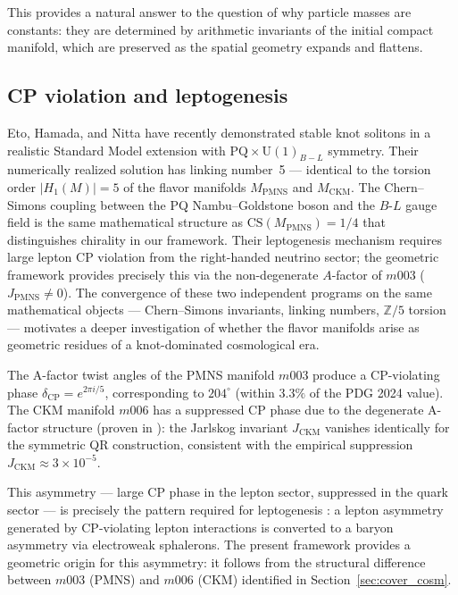 ﻿\documentclass[12pt]{article}
\theoremstyle{definition}
\begin{document}
This provides a natural answer to the question of why particle
masses are constants: they are determined by arithmetic invariants
of the initial compact manifold, which are preserved as the spatial
geometry expands and flattens.

\subsection{CP violation and leptogenesis}

Eto, Hamada, and Nitta \cite{Eto2025} have recently demonstrated stable knot
solitons in a realistic Standard Model extension with $\mathrm{PQ} \times
\mathrm{U}(1)_{B-L}$ symmetry. Their numerically realized solution has linking
number~5 --- identical to the torsion order $|H_1(M)| = 5$ of the flavor
manifolds $M_{\mathrm{PMNS}}$ and $M_{\mathrm{CKM}}$. The Chern--Simons
coupling between the PQ Nambu--Goldstone boson and the $B$-$L$ gauge field
is the same mathematical structure as $\mathrm{CS}(M_{\mathrm{PMNS}}) = 1/4$
that distinguishes chirality in our framework. Their leptogenesis mechanism
requires large lepton CP violation from the right-handed neutrino sector; the
geometric framework provides precisely this via the non-degenerate $A$-factor
of $m003$ ($J_{\mathrm{PMNS}} \neq 0$). The convergence of these two
independent programs on the same mathematical objects --- Chern--Simons
invariants, linking numbers, $\mathbb{Z}/5$ torsion --- motivates a deeper
investigation of whether the flavor manifolds arise as geometric residues of
a knot-dominated cosmological era.



The A-factor twist angles of the PMNS manifold $m003$ produce a
CP-violating phase $\delta_\mathrm{CP} = e^{2\pi i/5}$, corresponding
to $204^\circ$ (within $3.3\%$ of the PDG 2024 value). The CKM
manifold $m006$ has a suppressed CP phase due to the degenerate
A-factor structure (proven in \cite{Gentry:CP}): the Jarlskog
invariant $J_\mathrm{CKM}$ vanishes identically for the symmetric QR
construction, consistent with the empirical suppression
$J_\mathrm{CKM} \approx 3 \times 10^{-5}$.

This asymmetry --- large CP phase in the lepton sector, suppressed in
the quark sector --- is precisely the pattern required for
leptogenesis \cite{leptogenesis}: a lepton asymmetry generated by
CP-violating lepton interactions is converted to a baryon asymmetry
via electroweak sphalerons. The present framework provides a
geometric origin for this asymmetry: it follows from the structural
difference between $m003$ (PMNS) and $m006$ (CKM) identified in
Section~\ref{sec:cover_cosm}.
\end{document}
